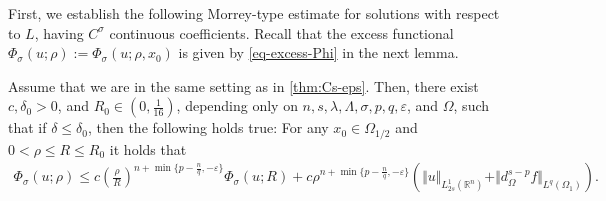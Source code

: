 \documentclass[11pt,reqno]{amsart}
\theoremstyle{plain}
\theoremstyle{definition}
\numberwithin{equation}{section}
\newcommand{\R}{\mathbb{R}}
\newcommand{\eps}{\varepsilon}
\newcommand{\1}{\mathbbm{1}}
\begin{document}
First, we establish the following Morrey-type estimate for solutions with respect to $L$, having $C^{\sigma}$ continuous coefficients. Recall that the excess functional $\Phi_{\sigma}(u; \rho):=\Phi_{\sigma}(u; \rho, x_0)$ is given by \eqref{eq-excess-Phi} in the next lemma.

\begin{lemma}
\label{lemma:Morrey-boundary}
Assume that we are in the same setting as in \autoref{thm:Cs-eps}. Then, there exist $c,\delta_0 > 0$, and $R_0 \in (0,\frac{1}{16})$, depending only on $n,s,\lambda,\Lambda,\sigma,p,q,\eps$, and $\Omega$, such that if $\delta \le \delta_0$, then the following holds true:
For any $x_0 \in \Omega_{1/2}$ and $0 < \rho \leq R \leq R_0$ it holds that
\begin{align*}
    \Phi_{\sigma}(u; \rho) \leq c \left( \frac{\rho}{R} \right)^{n+\min\{p-\frac{n}{q}, -\varepsilon\}} \Phi_{\sigma}(u; R) + c \rho^{n+\min\{p-\frac{n}{q}, -\varepsilon\}} \left( \Vert u \Vert_{L^1_{2s}(\R^n)} + \Vert d_{\Omega}^{s-p} f \Vert_{L^q(\Omega_1)} \right).
\end{align*}
\end{lemma}
\end{document}
